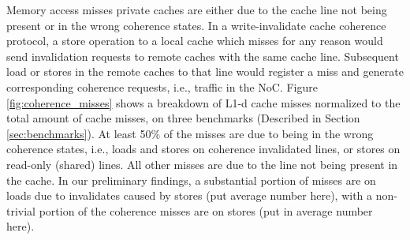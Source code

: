 

Memory access misses private caches are either due to the cache line not being present or in the wrong coherence states. In a write-invalidate cache coherence protocol, a store operation to a local cache which misses for any reason would send invalidation requests to remote caches with the same cache line. Subsequent load or stores in the remote caches to that line would register a miss and generate corresponding coherence requests, i.e., traffic in the NoC. Figure \ref{fig:coherence_misses} shows a breakdown of L1-d cache misses normalized to the total amount of cache misses, on three benchmarks (Described in Section \ref{sec:benchmarks}). At least 50\% of the misses are due to being in the wrong coherence states, i.e., loads and stores on coherence invalidated lines, or stores on read-only (shared) lines. All other misses are due to the line not being present in the cache. In our preliminary findings, a substantial portion of misses are on loads due to invalidates caused by stores (put average number here), with a non-trivial portion of the coherence misses are on stores (put in average number here). 

